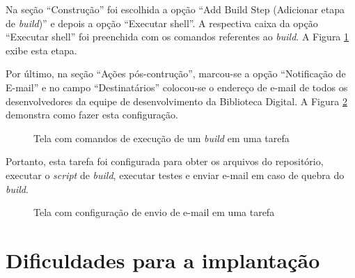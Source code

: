 Na seção ``Construção'' foi escolhida a opção ``Add Build Step (Adicionar etapa de \textit{build})'' e depois a opção ``Executar shell''. A respectiva caixa da opção ``Executar shell'' foi preenchida com os comandos referentes ao \textit{build}. A Figura \ref{configuracao_tarefa_build} exibe esta etapa.

Por último, na seção ``Ações pós-contrução'', marcou-se a opção ``Notificação de E-mail'' e no campo ``Destinatários'' colocou-se o endereço de e-mail de todos os desenvolvedores da equipe de desenvolvimento da Biblioteca Digital. A Figura \ref{configuracao_tarefa_email} demonstra como fazer esta configuração.

\begin{figure}[ht]
    \centering
    \caption{Tela com comandos de execução de um \textit{build} em uma tarefa}
    \label{configuracao_tarefa_build}
\end{figure}

Portanto, esta tarefa foi configurada para obter os arquivos do repositório, executar o \textit{script} de \textit{build}, executar testes e enviar e-mail em caso de quebra do \textit{build}.

\begin{figure}[ht]
    \centering
    \caption{Tela com configuração de envio de e-mail em uma tarefa}
    \label{configuracao_tarefa_email}
\end{figure}

\section{Dificuldades para a implantação}

